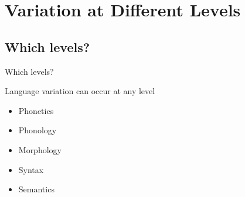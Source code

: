 \documentclass{beamer}
\subtitle[Variation at Different Levels]{Variation at Different Levels of Linguistic Structure}
\newcommand{\suboneone}{Which levels?}
\begin{document}
  

  \section{Variation at Different Levels}
    \subsection{\suboneone}
      \begin{frame}{\suboneone}
        \begin{block}{Language variation can occur at any level}
          \begin{itemize}
            \item Phonetics
            \item Phonology
            \item Morphology
            \item Syntax
            \item Semantics
          \end{itemize}
        \end{block}
      \end{frame}
\end{document}
